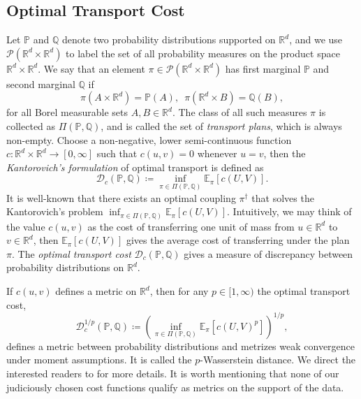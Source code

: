 \documentclass[12pt]{article}
\begin{document}
\subsection{Optimal Transport Cost}
Let $\mathbb{P}$ and $\mathbb{Q}$ denote two probability distributions supported on $\mathbb{R}^d$, and we use $\mathcal{P}(\mathbb{R}^d\times \mathbb{R}^d)$ to label the set of all probability measures on the product space $\mathbb{R}^d\times \mathbb{R}^d$. We say that an element $\pi\in\mathcal{P}(\mathbb{R}^d\times \mathbb{R}^d)$ has first marginal $\mathbb{P}$ and second marginal $\mathbb{Q}$ if \[
\pi(A\times \mathbb{R}^d) = \mathbb{P}(A), \,\,\,\pi(\mathbb{R}^d\times B) =\mathbb{Q}(B),
\]for all Borel measurable sets $A,B\in \mathbb{R}^d$. The class of all such measures $\pi$ is collected as $\Pi(\mathbb{P},\mathbb{Q})$, and is called the set of \textit{transport plans}, which is always non-empty. Choose a non-negative, lower semi-continuous function $c:\mathbb{R}^d\times \mathbb{R}^d \to [0,\infty]$ such that $c(u,v) = 0$ whenever $u=v$, then the \textit{Kantorovich's formulation} of optimal transport is defined as \[
\mathcal{D}_c(\mathbb{P},\mathbb{Q}) \coloneqq \inf_{\pi\in \Pi(\mathbb{P},\mathbb{Q})}  \mathbb{E}_\pi \left[ c(U,V) \right].
\] It is well-known that \citep[Theorem 4.1]{villani2008ot} there exists an optimal coupling $\pi^\dagger$ that solves the Kantorovich's problem $\inf_{\pi\in \Pi(\mathbb{P},\mathbb{Q})}  \mathbb{E}_\pi \left[ c(U,V) \right]$. Intuitively, we may think of the value $c(u,v)$ as the cost of transferring one unit of mass from $u \in \mathbb{R}^d$ to $v\in \mathbb{R}^d$, then $\mathbb{E}_\pi[c(U,V)]$ gives the average cost of transferring under the plan $\pi$. The \textit{optimal transport cost} $\mathcal{D}_c(\mathbb{P},\mathbb{Q})$ gives a measure of discrepancy between probability distributions on $\mathbb{R}^d$.

If $c(u,v)$ defines a metric on $\mathbb{R}^d$, then for any $p\in [1,\infty)$ the optimal transport cost, \[
\mathcal{D}_c^{1/p}(\mathbb{P},\mathbb{Q}) \coloneqq \left(\inf_{\pi\in \Pi(\mathbb{P},\mathbb{Q})}  \mathbb{E}_\pi \left[ c(U,V)^p \right] \right)^{1/p},
\]defines a metric between probability distributions and metrizes weak convergence under moment assumptions. It is called the $p$-Wasserstein distance. We direct the interested readers to \citep[Chapter 6]{villani2008ot} for more details. It is worth mentioning that none of our judiciously chosen cost functions qualify as metrics on the support of the data. 
\end{document}
